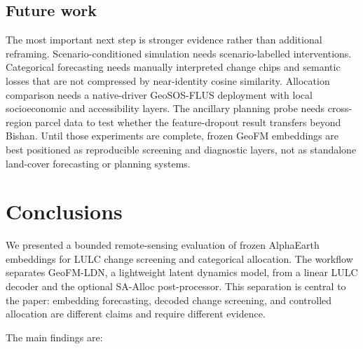 \documentclass{article}
\begin{document}
\subsection{Future work}
\label{sec:future}

The most important next step is stronger evidence rather than additional reframing. Scenario-conditioned simulation needs scenario-labelled interventions. Categorical forecasting needs manually interpreted change chips and semantic losses that are not compressed by near-identity cosine similarity. Allocation comparison needs a native-driver GeoSOS-FLUS deployment with local socioeconomic and accessibility layers. The ancillary planning probe needs cross-region parcel data to test whether the feature-dropout result transfers beyond Bishan. Until those experiments are complete, frozen GeoFM embeddings are best positioned as reproducible screening and diagnostic layers, not as standalone land-cover forecasting or planning systems.

\section{Conclusions}
\label{sec:conclusions}

We presented a bounded remote-sensing evaluation of frozen AlphaEarth embeddings for LULC change screening and categorical allocation. The workflow separates GeoFM-LDN, a lightweight latent dynamics model, from a linear LULC decoder and the optional SA-Alloc post-processor. This separation is central to the paper: embedding forecasting, decoded change screening, and controlled allocation are different claims and require different evidence.

The main findings are:
\end{document}
